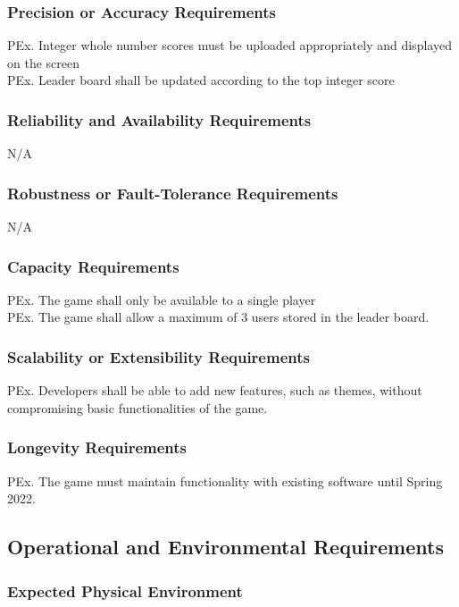 \documentclass{article}
\begin{document}
    \subsubsection{Precision or Accuracy Requirements}
    PEx. Integer whole number scores must be uploaded appropriately and displayed on the screen\\
    PEx. Leader board shall be updated according to the top integer score
    
    \subsubsection{Reliability and Availability Requirements}
    N/A

    \subsubsection{Robustness or Fault-Tolerance Requirements}
    N/A
    
    \subsubsection{Capacity Requirements}
    PEx. The game shall only be available to a single player\\
    PEx. The game shall allow a maximum of 3 users stored in the leader board.
    
    \subsubsection{Scalability or Extensibility Requirements}
    PEx. Developers shall be able to add new features, such as themes, without compromising basic functionalities of the game. 
    
    \subsubsection{Longevity Requirements}
    PEx. The game must maintain functionality with existing software until Spring 2022.


\subsection{Operational and Environmental Requirements}
    \subsubsection{Expected Physical Environment}
    
\end{document}
